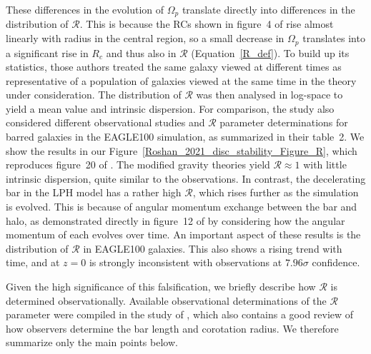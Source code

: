 \documentclass[fleqn,usenatbib,useAMS,onecolumn]{mnras} %
\begin{document}
These differences in the evolution of $\Omega_p$ translate directly into differences in the distribution of $\mathcal{R}$. This is because the RCs shown in figure~4 of \citet{Roshan_2021_disc_stability} rise almost linearly with radius in the central region, so a small decrease in $\Omega_p$ translates into a significant rise in $R_c$ and thus also in $\mathcal{R}$ (Equation~\ref{R_def}). To build up its statistics, those authors treated the same galaxy viewed at different times as representative of a population of galaxies viewed at the same time in the theory under consideration. The distribution of $\mathcal{R}$ was then analysed in log-space to yield a mean value and intrinsic dispersion. For comparison, the study also considered different observational studies and $\mathcal{R}$ parameter determinations for barred galaxies in the EAGLE100 simulation, as summarized in their table~2. We show the results in our Figure~\ref{Roshan_2021_disc_stability_Figure_R}, which reproduces figure~20 of \citet{Roshan_2021_disc_stability}. The modified gravity theories yield $\mathcal{R} \approx 1$ with little intrinsic dispersion, quite similar to the observations. In contrast, the decelerating bar in the LPH model has a rather high $\mathcal{R}$, which rises further as the simulation is evolved. This is because of angular momentum exchange between the bar and halo, as demonstrated directly in figure~12 of \citet{Roshan_2021_disc_stability} by considering how the angular momentum of each evolves over time. An important aspect of these results is the distribution of $\mathcal{R}$ in EAGLE100 galaxies. This also shows a rising trend with time, and at $z = 0$ is strongly inconsistent with observations at $7.96\sigma$ confidence.

Given the high significance of this falsification, we briefly describe how $\mathcal{R}$ is determined observationally. Available observational determinations of the $\mathcal{R}$ parameter were compiled in the study of \citet{Cuomo_2020}, which also contains a good review of how observers determine the bar length and corotation radius. We therefore summarize only the main points below.
\end{document}
